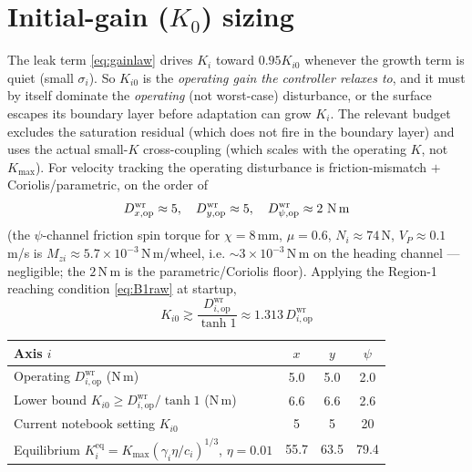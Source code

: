\documentclass[11pt]{article}
\theoremstyle{plain}
\theoremstyle{definition}
\newcommand{\Dwr}{D^{\mathrm{wr}}}
\newcommand{\Kmax}{K_{\max}}
\begin{document}
\section{Initial-gain ($K_{0}$) sizing}
\label{sec:K0}
The leak term \eqref{eq:gainlaw} drives $K_i$ toward $0.95K_{i0}$ whenever the
growth term is quiet (small $\sigma_i$). So $K_{i0}$ is the \emph{operating gain the
controller relaxes to}, and it must by itself dominate the \emph{operating} (not
worst-case) disturbance, or the surface escapes its boundary layer before adaptation
can grow $K_i$. The relevant budget excludes the saturation residual (which does not
fire in the boundary layer) and uses the actual small-$K$ cross-coupling
(which scales with the operating $K$, not $\Kmax$). For velocity tracking the
operating disturbance is friction-mismatch $+$ Coriolis/parametric, on the order of
\[
\Dwr_{x,\mathrm{op}}\approx5,\quad
\Dwr_{y,\mathrm{op}}\approx5,\quad
\Dwr_{\psi,\mathrm{op}}\approx2\ \text{N\,m}
\]
(the $\psi$-channel friction spin torque for $\chi=8\,$mm, $\mu=0.6$, $N_i\approx74\,$N,
$V_P\approx0.1\,$m/s is $M_{zi}\approx5.7\times10^{-3}\,$N\,m/wheel, i.e.
${\sim}3\times10^{-3}\,$N\,m on the heading channel --- negligible; the $2\,$N\,m is the
parametric/Coriolis floor). Applying the Region-1 reaching condition \eqref{eq:B1raw}
at startup,
\begin{equation}
\boxed{\;K_{i0}\gtrsim\frac{\Dwr_{i,\mathrm{op}}}{\tanh1}\approx1.313\,\Dwr_{i,\mathrm{op}}\;}
\end{equation}
\begin{center}
\begin{tabular}{lccc}
\toprule
Axis $i$ & $x$ & $y$ & $\psi$\\
\midrule
Operating $\Dwr_{i,\mathrm{op}}$ (N\,m) & 5.0 & 5.0 & 2.0\\
Lower bound $K_{i0}\ge\Dwr_{i,\mathrm{op}}/\tanh1$ (N\,m) & 6.6 & 6.6 & 2.6\\
Current notebook setting $K_{i0}$ & 5 & 5 & 20\\
\midrule
Equilibrium $K_i^{\mathrm{eq}}=\Kmax(\gamma_i\eta/c_i)^{1/3}$, $\eta=0.01$ & 55.7 & 63.5 & 79.4\\
\bottomrule
\end{tabular}
\end{center}
\end{document}
